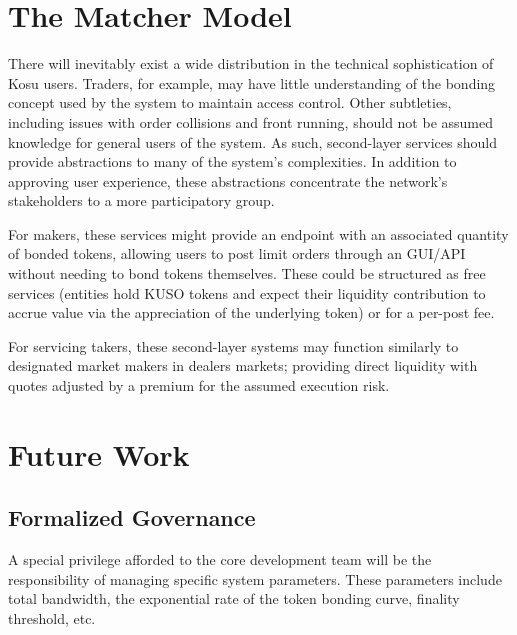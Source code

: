 \documentclass[10pt]{article}
\begin{document}
\section{The Matcher Model}\label{matcher-model}
There will inevitably exist a wide distribution in the technical sophistication of Kosu users. Traders, for example, may have little understanding of the bonding concept used by the system to maintain access control. Other subtleties, including issues with order collisions and front running, should not be assumed knowledge for general users of the system. As such, second-layer services should provide abstractions to many of the system’s complexities. In addition to approving user experience, these abstractions concentrate the network's stakeholders to a more participatory group.
\medskip 

For makers, these services might provide an endpoint with an associated quantity of bonded tokens, allowing users to post limit orders through an GUI/API without needing to bond tokens themselves. These could be structured as free services (entities hold KUSO tokens and expect their liquidity contribution to accrue value via the appreciation of the underlying token) or for a per-post fee.
\medskip

For servicing takers, these second-layer systems may function similarly to designated market makers in dealers markets; providing direct liquidity with quotes adjusted by a premium for the assumed execution risk.
\clearpage
\pagebreak


\section{Future Work}\label{future-work}
\subsection{Formalized Governance}\label{future-work-governance}
A special privilege afforded to the core development team will be the responsibility of managing specific system parameters. These parameters include total bandwidth, the exponential rate of the token bonding curve, finality threshold, etc.
\medskip
\end{document}
